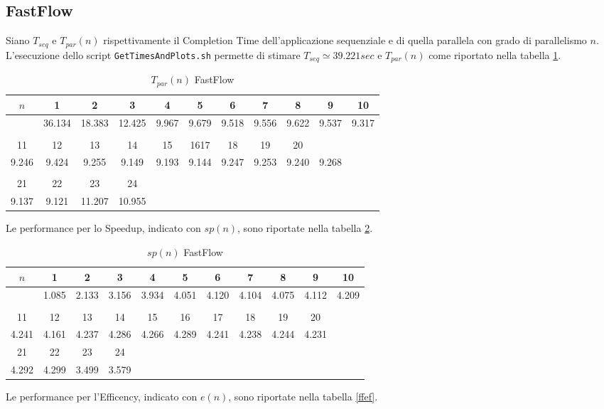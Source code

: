 \documentclass[12pt]{article}
\begin{document}
\subsection{FastFlow}
Siano $T_{seq}$ e $T_{par}(n)$ rispettivamente il Completion Time dell'applicazione sequenziale e di quella parallela con grado di parallelismo $n$. L'esecuzione dello script \texttt{GetTimesAndPlots.sh} permette di stimare $T_{seq} \simeq 39.221 sec$ e $T_{par}(n)$ come riportato nella tabella \ref{fftc}.

\begin{table}[!htbp]
\centering
\caption{$T_{par}(n)$ FastFlow}
\label{fftc}
\begin{tabular}{c c c c c c c c c c c }
$n$ & 1 & 2 & 3 & 4 & 5 & 6 & 7 & 8 & 9 & 10   \\ \hline
 & 36.134 & 18.383 & 12.425 & 9.967 & 9.679 & 9.518 & 9.556 & 9.622 & 9.537 & 9.317
   \\ \\
11 & 12 & 13 & 14 & 15 & 1617 & 18 & 19 & 20 \\ \hline
9.246 & 9.424 & 9.255 & 9.149 & 9.193 & 9.144 & 9.247 & 9.253 & 9.240 & 9.268
  \\ \\
21 & 22 & 23 & 24 \\ \hline
9.137 & 9.121 & 11.207 & 10.955
\end{tabular}
\end{table}
Le performance per lo Speedup, indicato con $sp(n)$, sono riportate nella tabella \ref{ffsp}.
\begin{table}[!htbp]
\centering
\caption{$sp(n)$ FastFlow}
\label{ffsp}
\begin{tabular}{c c c c c c c c c c c }
$n$ & 1 & 2 & 3 & 4 & 5 & 6 & 7 & 8 & 9 & 10   \\ \hline
 & 1.085 & 2.133 & 3.156 & 3.934 & 4.051 & 4.120 & 4.104 & 4.075 & 4.112 & 4.209
  \\ \\
11 & 12 & 13 & 14 & 15 & 16 & 17 & 18 & 19 & 20 \\ \hline
4.241 & 4.161 & 4.237 &4.286 & 4.266 & 4.289 & 4.241 & 4.238 & 4.244 & 4.231\\
21 & 22 & 23 & 24 \\ \hline
4.292 & 4.299 & 3.499 & 3.579
\end{tabular}
\end{table}
Le performance per l'Efficency, indicato con $e(n)$, sono riportate nella tabella \ref{ffef}.
\end{document}
